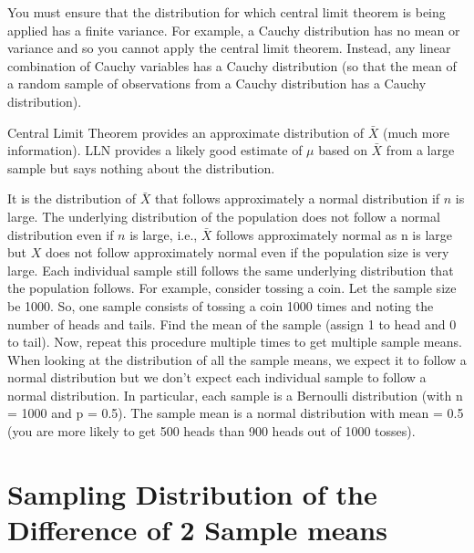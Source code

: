 \begin{note}
\end{note}
You must ensure that the distribution for which central limit theorem is being applied has a finite variance. For example, a Cauchy distribution has no mean or variance and so you cannot apply the central limit theorem.  Instead, any linear combination of Cauchy variables has a Cauchy distribution (so that the mean of a random sample of observations from a Cauchy distribution has a Cauchy distribution).
\begin{note}
\end{note}
Central Limit Theorem provides an approximate distribution of $\bar{X}$ (much more information). LLN provides a likely good estimate of $\mu$ based on $\bar{X}$ from a large sample but says nothing about the distribution.
\begin{note}
\end{note}
It is the distribution of $\bar{X}$ that follows approximately a normal distribution if $n$ is large. The underlying distribution of the population does not follow a normal distribution even if $n$ is large, i.e., $\bar{X}$ follows approximately normal as n is large but $X$ does not follow approximately normal even if the population size is very large. Each individual sample still follows the same underlying distribution that the population follows. For example, consider tossing a coin. Let the sample size be 1000. So, one sample consists of tossing a coin 1000 times and noting the number of heads and tails. Find the mean of the sample (assign 1 to head and 0 to tail). Now, repeat this procedure multiple times to get multiple sample means. When looking at the distribution of all the sample means, we expect it to follow a normal distribution but we don't expect each individual sample to follow a normal distribution. In particular, each sample is a Bernoulli distribution (with n = 1000 and p = 0.5). The sample mean is a normal distribution with mean = 0.5 (you are more likely to get 500 heads than 900 heads out of 1000 tosses).

\section{Sampling Distribution of the Difference of 2 Sample means}

